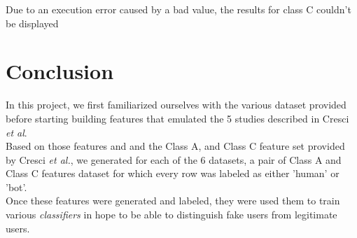\documentclass[a4paper,11pt]{article}
\begin{document}
	Due to an execution error caused by a bad value, the results for class C couldn't be displayed
	
\section{Conclusion}
In this project, we first familiarized ourselves with the various dataset provided before starting building features that emulated the 5 studies described in Cresci \textit{et al}. \\
Based on those features and and the Class A, and Class C feature set provided by Cresci \textit{et al.}, we generated for each of the 6 datasets, a pair of Class A and Class C features dataset for which every row was labeled as either 'human' or 'bot'.\\
Once these features were generated and labeled, they were used them to train various \textit{classifiers} in hope to be able to distinguish fake users from legitimate users.



\end{document}
